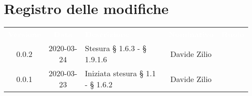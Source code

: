 
\section*{Registro delle modifiche}
{
	\renewcommand{\arraystretch}{1.5}
	\centering
	\begin{longtable}{ c c  C{4cm}  c  c }
		
		\textcolor{white}{\textbf{Versione}} & \textcolor{white}{\textbf{Data}} & \textcolor{white}{\textbf{Descrizione}} & \textcolor{white}{\textbf{Nominativo}} & \textcolor{white}{\textbf{Ruolo}}\\
		0.0.2 & 2020-03-24 & Stesura § 1.6.3 - § 1.9.1.6 & Davide Zilio &\reda{}\\
		
		0.0.1 & 2020-03-23 & Iniziata stesura § 1.1 - § 1.6.2 & Davide Zilio &\reda{}\\		
		
	\end{longtable}

}